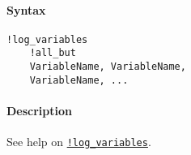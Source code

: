 


	\paragraph{Syntax}

\begin{verbatim}
!log_variables
    !all_but
    VariableName, VariableName, 
    VariableName, ...
\end{verbatim}

\paragraph{Description}

See help on \href{modellang/logvariables}{\texttt{!log\_variables}}.


